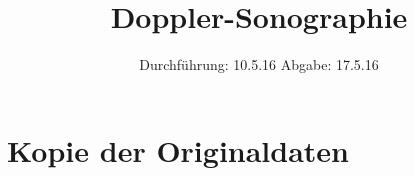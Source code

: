 

\subject{US 3}
\title{Doppler-Sonographie}
\date{
  Durchführung: 10.5.16
  \hspace{3em}
  Abgabe: 17.5.16
}



\maketitle
\thispagestyle{empty}
\tableofcontents
\newpage






\printbibliography

\appendix
\section{Kopie der Originaldaten}


